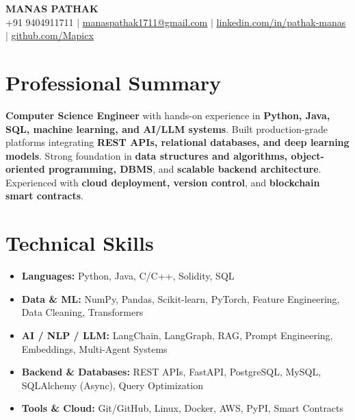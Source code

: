 \documentclass[letterpaper,11pt]{article}
\begin{document}

\begin{center}
    {\Huge \textbf{MANAS PATHAK}} \\[6pt]
    \small
    +91 9404911711 \quad $|$ \quad
    \href{mailto:manaspathak1711@gmail.com}{\underline{manaspathak1711@gmail.com}} \quad $|$ \quad
    \href{https://www.linkedin.com/in/pathak-manas/}{\underline{linkedin.com/in/pathak-manas}} \quad $|$ \quad
    \href{https://github.com/Mapicx}{\underline{github.com/Mapicx}}
\end{center}

\section{Professional Summary}
\small{
\textbf{Computer Science Engineer} with hands-on experience in \textbf{Python, Java, SQL, machine learning, and AI/LLM systems}. Built production-grade platforms integrating \textbf{REST APIs, relational databases, and deep learning models}. Strong foundation in \textbf{data structures and algorithms, object-oriented programming, DBMS}, and \textbf{scalable backend architecture}. Experienced with \textbf{cloud deployment, version control}, and \textbf{blockchain smart contracts}.
}

\vspace{4pt}

\section{Technical Skills}
\begin{itemize}[leftmargin=0.15in, label={}, itemsep=2pt]
    \item \textbf{Languages:} Python, Java, C/C++, Solidity, SQL
    \item \textbf{Data \& ML:} NumPy, Pandas, Scikit-learn, PyTorch, Feature Engineering, Data Cleaning, Transformers
    \item \textbf{AI / NLP / LLM:} LangChain, LangGraph, RAG, Prompt Engineering, Embeddings, Multi-Agent Systems
    \item \textbf{Backend \& Databases:} REST APIs, FastAPI, PostgreSQL, MySQL, SQLAlchemy (Async), Query Optimization
    \item \textbf{Tools \& Cloud:} Git/GitHub, Linux, Docker, AWS, PyPI, Smart Contracts
\end{itemize}
\end{document}
